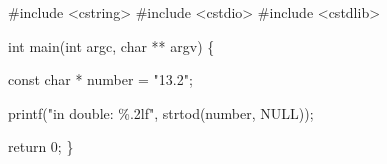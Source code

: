 \documentclass[11pt]{article}
\date{\today}
\title{}
\begin{document}
\tableofcontents

\#include <cstring>
\#include <cstdio>
\#include <cstdlib>

int main(int argc, char ** argv) \{

const char * number = "13.2";

printf("in double: \%.2lf\n", strtod(number, NULL));

  return 0;
\}
\end{document}
